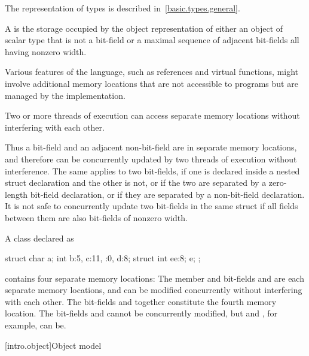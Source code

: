 \pnum
\begin{note}
The representation of types is described
in~\ref{basic.types.general}.
\end{note}

\pnum
A  is
the storage occupied by the object representation of
either an object of scalar type that is not a bit-field
or a maximal sequence of adjacent bit-fields all having nonzero width.
\begin{note}
Various
features of the language, such as references and virtual functions, might
involve additional memory locations that are not accessible to programs but are
managed by the implementation.
\end{note}
Two or more threads of
execution can access separate memory
locations without interfering with each other.

\pnum
\begin{note}
Thus a bit-field and an adjacent non-bit-field are in separate memory
locations, and therefore can be concurrently updated by two threads of execution
without interference. The same applies to two bit-fields, if one is declared
inside a nested struct declaration and the other is not, or if the two are
separated by a zero-length bit-field declaration, or if they are separated by a
non-bit-field declaration. It is not safe to concurrently update two bit-fields
in the same struct if all fields between them are also bit-fields of nonzero
width.
\end{note}

\pnum
\begin{example}
A class declared as
\begin{codeblock}
struct {
  char a;
  int b:5,
  c:11,
  :0,
  d:8;
  struct {int ee:8;} e;
};
\end{codeblock}
contains four separate memory locations: The member  and bit-fields
 and  are each separate memory locations, and can be
modified concurrently without interfering with each other. The bit-fields
 and  together constitute the fourth memory location. The
bit-fields  and  cannot be concurrently modified, but
 and , for example, can be.
\end{example}

[intro.object]{Object model}

